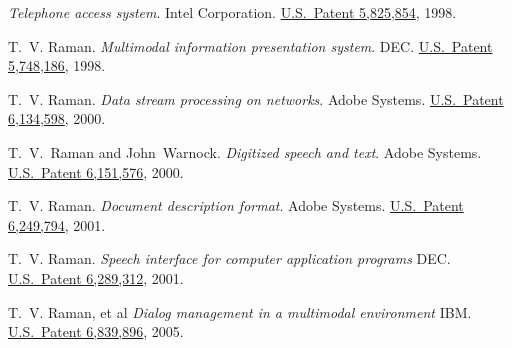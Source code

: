 \documentclass{article}
\begin{document}
\begin{compactitem}{}
 \emph{Telephone access system}.  
 Intel Corporation.
 \href{http://patft.uspto.gov/netacgi/nph-Parser?TERM1=5,825,854&Sect1=PTO1&Sect2=HITOFF&d=PALL&p=1&u=\%2Fnetahtml\%2Fsrchnum.htm&r=0&f=S&l=50}%
{U.S.\ Patent 5,825,854},  1998.
\item  T.~V. Raman.  
  \emph{Multimodal information presentation system}.  
 DEC.\@
 \href{http://patft.uspto.gov/netacgi/nph-Parser?TERM1=5,748,186&Sect1=PTO1&Sect2=HITOFF&d=PALL&p=1&u=\%2Fnetahtml\%2Fsrchnum.htm&r=0&f=S&l=50}%
{U.S.\ Patent 5,748,186,}  1998.
\item  T.~V. Raman.  
 \emph{Data
    stream processing on networks}.  
 Adobe Systems.
 \href{http://patft.uspto.gov/netacgi/nph-Parser?TERM1=6,134,598&Sect1=PTO1&Sect2=HITOFF&d=PALL&p=1&u=\%2Fnetahtml\%2Fsrchnum.htm&r=0&f=S&l=50}%
{U.S.\ Patent 6,134,598},  2000.
\item   T.~V.\ Raman and John~Warnock.
 \emph{Digitized speech and text}.  
 Adobe
  Systems.
 \href{http://patft.uspto.gov/netacgi/nph-Parser?TERM1=6,151,576&Sect1=PTO1&Sect2=HITOFF&d=PALL&p=1&u=\%2Fnetahtml\%2Fsrchnum.htm&r=0&f=S&l=50}%
{U.S.\ Patent 6,151,576},  2000.
\item   T.~V. Raman.  
 \emph{Document
    description format}.  
 Adobe Systems.
 \href{http://patft.uspto.gov/netacgi/nph-Parser?TERM1=6,249,794&Sect1=PTO1&Sect2=HITOFF&d=PALL&p=1&u=\%2Fnetahtml\%2Fsrchnum.htm&r=0&f=S&l=50}%
{U.S.\ Patent 6,249,794},  2001.
\item   T.~V. Raman.  
  \emph{Speech interface for computer application programs\/}
 DEC.\@
  \href{http://patft.uspto.gov/netacgi/nph-Parser?Sect1=PTO1&Sect2=HITOFF&d=PALL&p=1&u=/netahtml/srchnum.htm&r=1&f=G&l=50&s1='6289312'.WKU.&OS=PN/6289312&RS=PN/6289312}
  {U.S.\ Patent 6,289,312},  2001.
\item   T.~V. Raman,  et al 
  \emph{Dialog management  in a
multimodal environment\/}
 IBM.  \@
  \href{http://patft.uspto.gov/netacgi/nph-Parser?Sect1=PTO1\&Sect2=HITOFF\&d=PALL\&p=1\&u=/netahtml/srchnum.htm\&r=1\&f=G\&l=50\&s1=6839896.WKU.\&OS=PN/6839896\&RS=PN/6839896}
  {U.S.\ Patent 6,839,896},  2005.
% 
% 

\end{compactitem}
\end{document}
